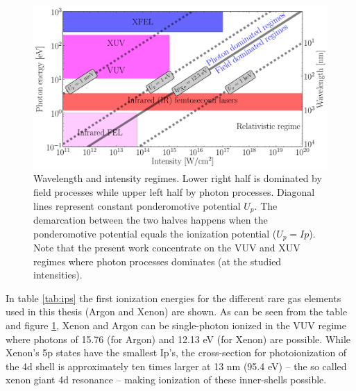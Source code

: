 \begin{figure}
\centering
\includegraphics[width=\figurewidth]{figures/regimes}
\caption{Wavelength and intensity regimes. Lower right half is dominated
         by field processes while upper left half by photon processes. Diagonal
         lines represent constant ponderomotive potential $U_p$. The
         demarcation between the two halves happens when the ponderomotive
         potential equals the ionization potential ($U_p = Ip$).
         Note that the present work concentrate on the VUV and XUV regimes
         where photon processes dominates (at the studied intensities).}
\label{fig:regimes}
\end{figure}

In table \ref{tab:ips} the first ionization energies for the different
rare gas elements used in this thesis (Argon and Xenon) are shown. As can be
seen from the table and figure \ref{fig:regimes}, Xenon and Argon can be
single-photon ionized in the VUV regime where photons of 15.76 (for Argon)
and 12.13 eV (for Xenon) are possible. While Xenon's 5p states have the smallest
Ip's, the cross-section for photoionization of the 4d shell is approximately ten
times larger at 13 nm (95.4 eV) -- the so called xenon giant 4d
resonance\cite{Becker1986} -- making ionization of these inner-shells
possible\cite{Thomas2009,Ackad2013}.

